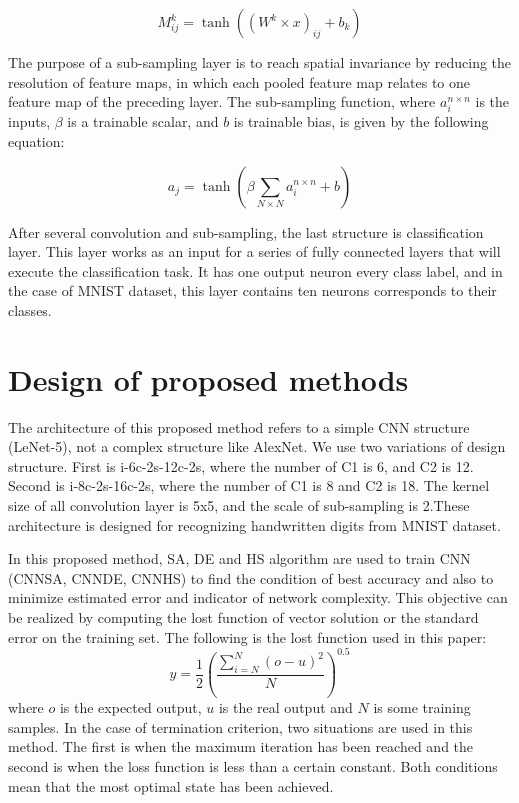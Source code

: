 \documentclass[10pt,letterpaper]{article}
\begin{document}
\begin{equation}
M_{ij}^k=\tanh((W^k \times x)_{ij} + b_k)
\end{equation}

The purpose of a sub-sampling layer is to reach spatial invariance by reducing the resolution of feature maps, in which each pooled feature map relates to one feature map of the preceding layer. The sub-sampling function, where \(a_i^{n \times n} \) is the inputs, \( \beta \) is a trainable scalar, and \( b \) is trainable bias, is given by the following equation:

\begin{equation}
a_j=\tanh\left(\beta\sum_{N\times N}{a_i^{n \times n} + b}\right)
\end{equation}

After several convolution and sub-sampling, the last structure is classification layer. This layer works as an input for a series of fully connected layers that will execute the classification task. It has one output neuron every class label, and in the case of MNIST dataset, this layer contains ten neurons corresponds to their classes.

\section{Design of proposed methods}
The architecture of this proposed method refers to a simple CNN structure (LeNet-5), not a complex structure like AlexNet\cite{Alexnet}. We use two variations of design structure. First is i-6c-2s-12c-2s, where the number of C1 is 6, and C2 is 12. Second is i-8c-2s-16c-2s, where the number of C1 is 8 and C2 is 18. The kernel size of all convolution layer is 5x5,  and the scale of sub-sampling is 2.These architecture is designed for recognizing handwritten digits from MNIST dataset.

In this proposed method, SA, DE and HS algorithm are used to train CNN (CNNSA, CNNDE, CNNHS) to find the condition of best accuracy and also to minimize estimated error and indicator of network complexity. This objective can be realized by computing the lost function of vector solution or the standard error on the training set. The following is the lost function used in this paper:
\begin{equation}
y= \frac {1}{2} \left({\frac{\sum_{i=N}^{N}{(o - u)^2}}{N}}\right)^{0.5}
\end{equation}
where $o$ is the expected output, $u$ is the real output and $N$ is some training samples. In the case of termination criterion, two situations are used in this method. The first is when the maximum iteration has been reached and the second is when the loss function is less than a certain constant. Both conditions mean that the most optimal state has been achieved.
\end{document}
